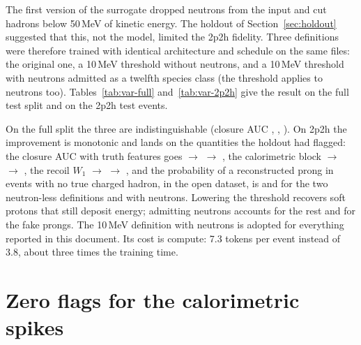 \documentclass[11pt]{article}
\begin{document}
The first version of the surrogate dropped neutrons from the input and cut hadrons below 50\,MeV of kinetic
energy. The holdout of Section~\ref{sec:holdout} suggested that this, not the model, limited the 2p2h fidelity.
Three definitions were therefore trained with identical architecture and schedule on the same files: the original
one, a 10\,MeV threshold without neutrons, and a 10\,MeV threshold with neutrons admitted as a twelfth species
class (the threshold applies to neutrons too). Tables~\ref{tab:var-full} and~\ref{tab:var-2p2h} give the result on
the full test split and on the 2p2h test events.

On the full split the three are indistinguishable (closure AUC \nVKEfiftyFullAUCmarg{}, \nVKEtenFullAUCmarg{},
\nVKEtennFullAUCmarg{}). On 2p2h the improvement is monotonic and lands on the quantities the holdout had flagged:
the closure AUC with truth features goes \nVKEfiftyTwoPAUCcond{} $\to$ \nVKEtenTwoPAUCcond{} $\to$
\nVKEtennTwoPAUCcond{}, the calorimetric block \nVKEfiftyTwoPCalo{} $\to$ \nVKEtenTwoPCalo{} $\to$
\nVKEtennTwoPCalo{}, the recoil $W_1$ \nVKEfiftyTwoPWoneRecoil{} $\to$ \nVKEtenTwoPWoneRecoil{} $\to$
\nVKEtennTwoPWoneRecoil{}, and the probability of a reconstructed prong in events with no true charged hadron,
\nVKEfiftyTwoPFakeReal{} in the open dataset, is \nVKEfiftyTwoPFakeSur{} and \nVKEtenTwoPFakeSur{} for the two
neutron-less definitions and \nVKEtennTwoPFakeSur{} with neutrons. Lowering the threshold recovers soft protons that
still deposit energy; admitting neutrons accounts for the rest and for the fake prongs. The 10\,MeV definition with
neutrons is adopted for everything reported in this document. Its cost is compute: 7.3 tokens per event instead of
3.8, about three times the training time.

\begin{table}[h]\centering\small
\resizebox{\textwidth}{!}{}
\caption{Input-definition variants on the full test split: 50\,MeV without neutrons (ke50), 10\,MeV without
neutrons (ke10), 10\,MeV with neutron tokens (ke10n).}
\label{tab:var-full}
\end{table}

\begin{table}[h]\centering\small
\resizebox{\textwidth}{!}{}
\caption{The same variants on the 2p2h test events.}
\label{tab:var-2p2h}
\end{table}

\section{Zero flags for the calorimetric spikes}
\label{sec:zero}
\end{document}
